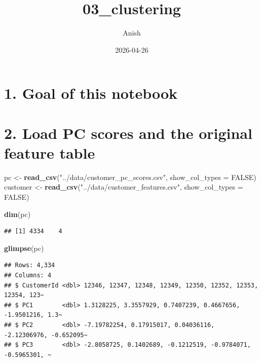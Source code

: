 \documentclass[
]{article}
\title{03\_clustering}
\author{Anish}
\date{2026-04-26}
\newenvironment{Shaded}{\begin{snugshade}}{\end{snugshade}}
\newcommand{\AttributeTok}[1]{\textcolor[rgb]{0.13,0.29,0.53}{#1}}
\newcommand{\ConstantTok}[1]{\textcolor[rgb]{0.56,0.35,0.01}{#1}}
\newcommand{\FunctionTok}[1]{\textcolor[rgb]{0.13,0.29,0.53}{\textbf{#1}}}
\newcommand{\NormalTok}[1]{#1}
\newcommand{\OtherTok}[1]{\textcolor[rgb]{0.56,0.35,0.01}{#1}}
\newcommand{\StringTok}[1]{\textcolor[rgb]{0.31,0.60,0.02}{#1}}
\begin{document}
\maketitle

\section{1. Goal of this notebook}\label{goal-of-this-notebook}

\section{2. Load PC scores and the original feature
table}\label{load-pc-scores-and-the-original-feature-table}

\begin{Shaded}
\begin{Highlighting}[]
\NormalTok{pc }\OtherTok{\textless{}{-}} \FunctionTok{read\_csv}\NormalTok{(}\StringTok{"../data/customer\_pc\_scores.csv"}\NormalTok{,}
               \AttributeTok{show\_col\_types =} \ConstantTok{FALSE}\NormalTok{)}
\NormalTok{customer }\OtherTok{\textless{}{-}} \FunctionTok{read\_csv}\NormalTok{(}\StringTok{"../data/customer\_features.csv"}\NormalTok{,}
                     \AttributeTok{show\_col\_types =} \ConstantTok{FALSE}\NormalTok{)}

\FunctionTok{dim}\NormalTok{(pc)}
\end{Highlighting}
\end{Shaded}

\begin{verbatim}
## [1] 4334    4
\end{verbatim}

\begin{Shaded}
\begin{Highlighting}[]
\FunctionTok{glimpse}\NormalTok{(pc)}
\end{Highlighting}
\end{Shaded}

\begin{verbatim}
## Rows: 4,334
## Columns: 4
## $ CustomerId <dbl> 12346, 12347, 12348, 12349, 12350, 12352, 12353, 12354, 123~
## $ PC1        <dbl> 1.3128225, 3.3557929, 0.7407239, 0.4667656, -1.9501216, 1.3~
## $ PC2        <dbl> -7.19782254, 0.17915017, 0.04036116, -2.12306976, -0.652095~
## $ PC3        <dbl> -2.8058725, 0.1402689, -0.1212519, -0.9784071, -0.5965301, ~
\end{verbatim}
\end{document}

